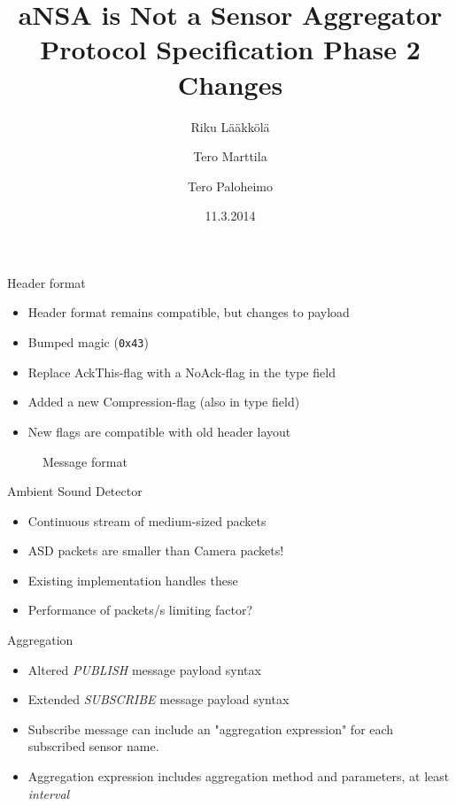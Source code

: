 \documentclass{beamer}
\title[SFO protocol]{aNSA is Not a Sensor Aggregator\\Protocol Specification Phase 2 Changes}
\author{Riku Lääkkölä \and Tero Marttila \and Tero Paloheimo}
\institute{Aalto ELEC}
\date{11.3.2014}
\begin{document}
\begin{frame}
\titlepage
\end{frame}

\begin{frame}{Header format}
\begin{itemize}
	\item Header format remains compatible, but changes to payload
	\item Bumped magic (\texttt{0x43})
	\item Replace AckThis-flag with a NoAck-flag in the type field
	\item Added a new Compression-flag (also in type field)
	\item New flags are compatible with old header layout
\end{itemize}

\begin{figure}
    \begin{center}
        {\tiny }
        \caption{Message format}
        \label{fig:header}
    \end{center}
\end{figure}

\end{frame}

\begin{frame}{Ambient Sound Detector}
\begin{itemize}
	\item Continuous stream of medium-sized packets
	\item ASD packets are smaller than Camera packets!
	\item Existing implementation handles these
	\item Performance of packets/s limiting factor?
\end{itemize}
\end{frame}

\begin{frame}{Aggregation}
\begin{itemize}
	\item Altered \emph{PUBLISH} message payload syntax
	\item Extended \emph{SUBSCRIBE} message payload syntax
	\item Subscribe message can include an "aggregation expression" for each subscribed sensor name.
	\item Aggregation expression includes aggregation method and parameters, at least \emph{interval}
\end{itemize}
\end{frame}
\end{document}
